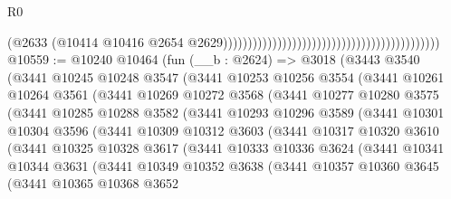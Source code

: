 \begin{lexlean}{R0}
\begin{coremodule}
                                                                                        (@2633
                                                                                          (@10414
                                                                                            @10416
                                                                                            @2654
                                                                                            @2629))))))))))))))))))))))))))))))))))))))))))))
@10559 := @10240
    @10464
    (fun (__b : @2624) =>
    @3018
      (@3443
        @3540
        (@3441
          @10245
          @10248
          @3547
          (@3441
            @10253
            @10256
            @3554
            (@3441
              @10261
              @10264
              @3561
              (@3441
                @10269
                @10272
                @3568
                (@3441
                  @10277
                  @10280
                  @3575
                  (@3441
                    @10285
                    @10288
                    @3582
                    (@3441
                      @10293
                      @10296
                      @3589
                      (@3441
                        @10301
                        @10304
                        @3596
                        (@3441
                          @10309
                          @10312
                          @3603
                          (@3441
                            @10317
                            @10320
                            @3610
                            (@3441
                              @10325
                              @10328
                              @3617
                              (@3441
                                @10333
                                @10336
                                @3624
                                (@3441
                                  @10341
                                  @10344
                                  @3631
                                  (@3441
                                    @10349
                                    @10352
                                    @3638
                                    (@3441
                                      @10357
                                      @10360
                                      @3645
                                      (@3441
                                        @10365
                                        @10368
                                        @3652

\end{coremodule}
\end{lexlean}
